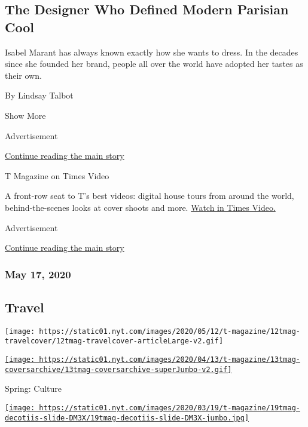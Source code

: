 \begin{enumerate}
  \hypertarget{the-designer-who-defined-modern-parisian-cool}{%
  \subsection{The Designer Who Defined Modern Parisian
  Cool}\label{the-designer-who-defined-modern-parisian-cool}}

  Isabel Marant has always known exactly how she wants to dress. In the
  decades since she founded her brand, people all over the world have
  adopted her tastes as their own.

  By Lindsay Talbot
\end{enumerate}

Show More

Advertisement

\protect\hyperlink{after-mid2}{Continue reading the main story}

T Magazine on Times Video

A front-row seat to T's best videos: digital house tours from around the
world, behind-the-scenes looks at cover shoots and more.
\href{https://www.nytimes.com/video/t-magazine}{Watch in Times Video.}

Advertisement

\protect\hyperlink{after-mktg}{Continue reading the main story}

\hypertarget{may-17-2020}{%
\subsubsection{May 17, 2020}\label{may-17-2020}}

\href{https://www.nytimes.com/issue/t-magazine/2020/05/02/ts-may-17-travel-issue}{}

\hypertarget{travel}{%
\subsection{Travel}\label{travel}}

\texttt{[image: https://static01.nyt.com/images/2020/05/12/t-magazine/12tmag-travelcover/12tmag-travelcover-articleLarge-v2.gif]}

\href{https://www.nytimes.com/issue/t-magazine/2020/04/12/ts-april-19-culture-issue}{\texttt{[image: https://static01.nyt.com/images/2020/04/13/t-magazine/13tmag-coversarchive/13tmag-coversarchive-superJumbo-v2.gif]}}

Spring: Culture

\href{https://www.nytimes.com/issue/t-magazine/2020/03/06/ts-march-22-design-issue}{\texttt{[image: https://static01.nyt.com/images/2020/03/19/t-magazine/19tmag-decotiis-slide-DM3X/19tmag-decotiis-slide-DM3X-jumbo.jpg]}}

